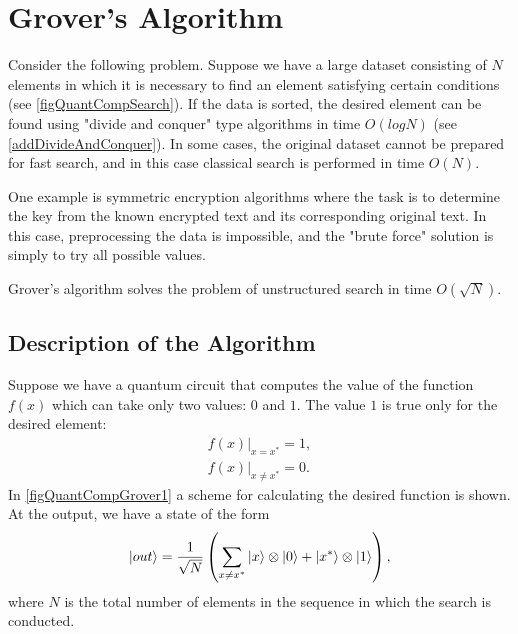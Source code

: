 \section{Grover's Algorithm}
Consider the following problem. Suppose we have a large dataset
consisting of $N$ elements in which it is necessary to find an element
satisfying certain conditions (see \autoref{figQuantCompSearch}).
If the data is sorted, the desired element can be
found using "divide and conquer" type algorithms in time $O\left(log N\right)$
(see \autoref{addDivideAndConquer}). In some cases, the original dataset
cannot be prepared for fast search, and in this case
classical search is performed in time $O\left(N\right)$.



One example is symmetric encryption algorithms
where the task is to determine the key from the known encrypted
text and its corresponding original text. In this case,
preprocessing the data is impossible, and the "brute force" solution
is simply to try all possible values.

Grover's algorithm \cite{Grover96afast} solves the problem
of unstructured search in time $O\left(\sqrt{N}\right)$.

\subsection{Description of the Algorithm}

Suppose we have a quantum circuit that computes the value
of the function $f\left(x\right)$ which can take only two values:
$0$ and $1$. The value $1$ is true only for the desired
element: 
\begin{eqnarray}
\left.f\left(x\right)\right|_{x = x^{\ast}} = 1,
\nonumber \\
\left.f\left(x\right)\right|_{x \ne x^{\ast}} = 0.
\label{eqQuantCompGroverF}
\end{eqnarray}
In \autoref{figQuantCompGrover1} a scheme for calculating
the desired function is shown. At the output, we have a state of the form
\begin{equation}
\ket{out} = \frac{1}{\sqrt{N}}\left(
 \sum_{x \ne x^{\ast}} \ket{x}\otimes\ket{0}
+ \left|x^{\ast}\right>\otimes\ket{1}
\right),
\label{eqQuantCompGroverFake}
\end{equation}
where $N$ is the total number of elements in the sequence in which
the search is conducted.

